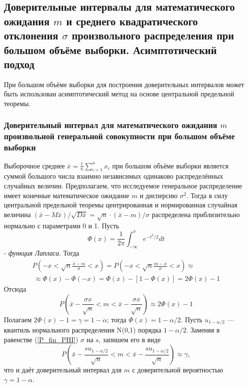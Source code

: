 \subsection{Доверительные интервалы для математического ожидания $m$ и среднего квадратического отклонения $\sigma$ произвольного распределения при большом объёме выборки. Асимптотический подход}
При большом объёме выборки для построения доверительных интервалов может быть использован асимптотический метод на основе центральной предельной теоремы.
\subsubsection{Доверительный интервал для математического ожидания $m$ произвольной генеральной совокупности при большом объёме выборки}
Выборочное среднее $\bar{x} = \frac{1}{n}\sum_{i = 1}^{n}{x_{i}}$ при большом объёме выборки является суммой большого числа взаимно независимых одинаково распределённых случайных величин. Предполагаем, что исследуемое генеральное распределение имеет конечные математическое ожидание $m$ и дисперсию $\sigma^{2}$. Тогда в силу центральной предельной теоремы центрированная и нормированная случайная величина $(\bar{x} - M\bar{x}) / \sqrt{D\bar{x}} = \sqrt{n}·(\bar{x}-m)/\sigma$ распределена приблизительно нормально с параметрами 0 и 1. Пусть
\begin{equation}
    \Phi(x) = \frac{1}{2\pi}\int_{-\infty}^{x}{e^{-t^{2}/2}dt}
    \label{f_lapl}
\end{equation}
- \textit{функция Лапласа}. Тогда
\begin{multline}
    P\left(-x < \sqrt{n}\frac{\bar{x} - m}{\sigma} < x \right) = 
    P\left(-x < \sqrt{n}\frac{m - \bar{x}}{\sigma} < x \right) \approx \\\
    \approx \Phi(x) - \Phi(-x)=\Phi(x) - [1 - \Phi(x)] = 2\Phi(x) - 1
    \label{P_PHI}
\end{multline}
Отсюда
\begin{equation}
    P\left(\bar{x} - \frac{\sigma x}{\sqrt{n}} < m < \bar{x} - \frac{\sigma x}{\sqrt{n}} \right) \approx 2\Phi(x) - 1
    \label{P_fin_PHI}
\end{equation}
Полагаем $2\Phi(x) - 1 = \gamma = 1 - \alpha$; тогда $\Phi(x) = 1 - \alpha/2$. Пусть $u_{1-\alpha/2}$ — квантиль нормального распределения N(0,1) порядка $1-\alpha/2$. Заменяя в равенстве (\ref{P_fin_PHI}) $\sigma$ на $s$, запишем его в виде
\begin{equation}
    P\left(\bar{x} - \frac{su_{1-\alpha/2}}{\sqrt{n}} < m < \bar{x} - \frac{su_{1-\alpha/2}}{\sqrt{n}} \right) \approx \gamma,
    \label{P_fin_u}
\end{equation}
что и даёт доверительный интервал для $m$ с доверительной вероятностью $\gamma = 1-\alpha$.

